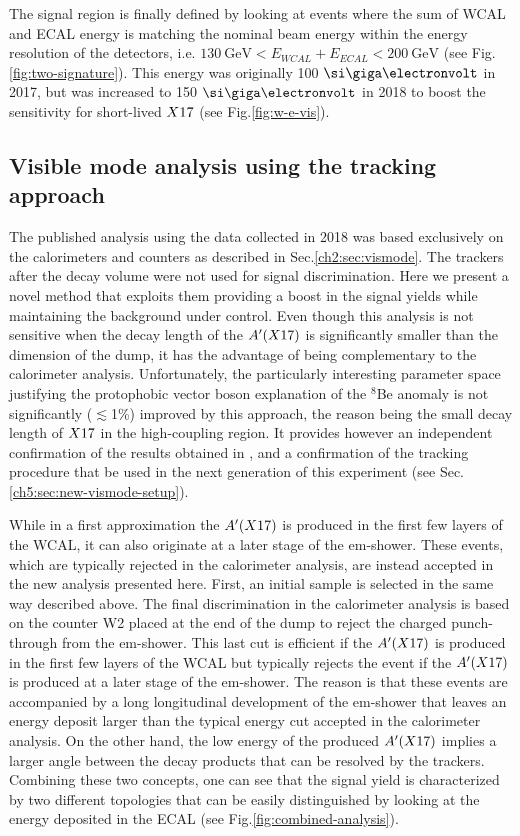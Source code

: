 The signal region is finally defined by looking at events where the sum of WCAL and ECAL energy is matching the nominal beam energy within the energy resolution of the detectors, i.e. $\SI{130}{\giga\electronvolt} < E_{WCAL} + E_{ECAL} < \SI{200}{\giga\electronvolt}$ (see Fig.\ref{fig:two-signature}). This energy was originally 100 $\gev$ in 2017, but was increased to 150 $\gev$ in 2018 to boost the sensitivity for short-lived $X17$ (see Fig.\ref{fig:w-e-vis}).

\subsection{Visible mode analysis using the tracking approach}
\label{ch3:sec:vis-mode-tracking}

The published analysis using the data collected in 2018 \cite{Banerjee:2019hmi} was based exclusively on the calorimeters and counters as described in Sec.\ref{ch2:sec:vismode}. The trackers after the decay volume were not used for signal discrimination. Here we present a novel method that exploits them providing a boost in the signal yields while maintaining the background under control. Even though this analysis is not sensitive when the decay length of the $A'(X17)$ is significantly smaller than the dimension of the dump, it has the advantage of being complementary to the calorimeter analysis. Unfortunately, the particularly interesting parameter space justifying the protophobic vector boson explanation of the $^8$Be anomaly is not significantly ($\lesssim$1\%) improved by this approach, the reason being the small decay length of $X17$ in the high-coupling region. It provides however an independent confirmation of the results obtained in \cite{Banerjee:2019hmi}, and a confirmation of the tracking procedure that be used in the next generation of this experiment (see Sec.\ref{ch5:sec:new-vismode-setup}).

While in a first approximation the $A'(X17)$ is produced in the first few layers of the WCAL, it can also originate at a later stage of the em-shower. These events, which are typically rejected in the calorimeter analysis, are instead accepted in the new analysis presented here. First, an initial sample is selected in the same way described above. The final discrimination in the calorimeter analysis is based on the counter W2 placed at the end of the dump to reject the charged punch-through from the em-shower. This last cut is efficient if the $A'(X17)$ is produced in the first few layers of the WCAL but typically rejects the event if the $A'(X17)$ is produced at a later stage of the em-shower. The reason is that these events are accompanied by a long longitudinal development of the em-shower that leaves an energy deposit larger than the typical energy cut accepted in the calorimeter analysis. On the other hand, the low energy of the produced $A'(X17)$ implies a larger angle between the decay products that can be resolved by the trackers. Combining these two concepts, one can see that the signal yield is characterized by two different topologies that can be easily distinguished by looking at the energy deposited in the ECAL (see Fig.\ref{fig:combined-analysis}).


